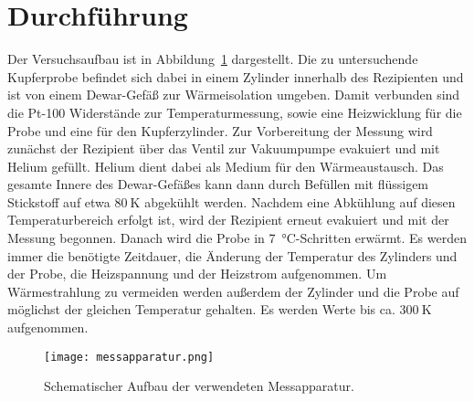 \documentclass[
  bibliography=totoc,     %
  captions=tableheading,  %
  titlepage=firstiscover, %
]{scrartcl}
\begin{document}
\section{Durchführung}
\label{sec:durchführung}
Der Versuchsaufbau ist in Abbildung~\ref{fig:aufbau} dargestellt. Die zu
untersuchende Kupferprobe befindet sich dabei in
einem Zylinder innerhalb des Rezipienten und ist von einem Dewar-Gefäß zur
Wärmeisolation umgeben. Damit verbunden sind die Pt-100 Widerstände zur
Temperaturmessung, sowie eine Heizwicklung für die Probe und eine für den
Kupferzylinder. Zur Vorbereitung der Messung wird zunächst der Rezipient über
das Ventil zur Vakuumpumpe evakuiert und mit Helium gefüllt. Helium dient dabei
als Medium für den Wärmeaustausch. Das gesamte Innere des Dewar-Gefäßes kann
dann durch Befüllen mit flüssigem Stickstoff auf etwa $\SI{80}{\kelvin}$
abgekühlt werden. Nachdem eine Abkühlung auf diesen Temperaturbereich erfolgt
ist, wird der Rezipient erneut evakuiert und mit der Messung begonnen.
Danach wird die Probe in \SI{7}{\celsius}-Schritten erwärmt. Es werden immer die benötigte
Zeitdauer, die Änderung der Temperatur des Zylinders und der Probe, die
Heizspannung und der Heizstrom aufgenommen. Um Wärmestrahlung zu vermeiden werden
außerdem der Zylinder und die Probe auf möglichst der gleichen Temperatur gehalten.
Es werden Werte bis ca. $\SI{300}{\kelvin}$ aufgenommen.

\begin{figure}
    \centering
    \texttt{[image: messapparatur.png]}
    \caption{Schematischer Aufbau der verwendeten Messapparatur.\cite{V47}}
    \label{fig:aufbau}
\end{figure}
\end{document}
